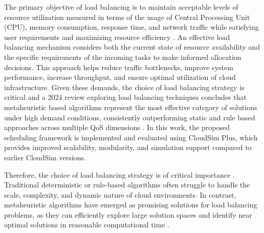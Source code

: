 \documentclass[pdflatex,sn-mathphys-num]{sn-jnl}%
\begin{document}
The primary objective of load balancing is to maintain acceptable levels of resource utilization measured in terms of the usage of Central Processing Unit (CPU), memory consumption, response time, and network traffic while satisfying user requirements and maximizing resource efficiency \cite{loadBalancing2}. An effective load balancing mechanism considers both the current state of resource availability and the specific requirements of the incoming tasks to make informed allocation decisions. This approach helps reduce traffic bottlenecks, improve system performance, increase throughput, and ensure optimal utilization of cloud infrastructure. Given these demands, the choice of load balancing strategy is critical and a 2024 review exploring load balancing techniques concludes that metaheuristic based algorithms represent the most effective category of solutions under high demand conditions, consistently outperforming static and rule based approaches across multiple QoS dimensions \cite{LoadBalancing3_sol, sultan2026improving_lb_csplus}. In this work, the proposed scheduling framework is implemented and evaluated using CloudSim Plus, which provides improved scalability, modularity, and simulation support compared to earlier CloudSim versions.

Therefore, the choice of load balancing strategy is of critical importance \cite{LoadBalancing3_sol}. Traditional deterministic or rule-based algorithms often struggle to handle the scale, complexity, and dynamic nature of cloud environments. In contrast, metaheuristic algorithms have emerged as promising solutions for load balancing problems, as they can efficiently explore large solution spaces and identify near optimal solutions in reasonable computational time \cite{PSO, Adegbite2026_intro_for_meta_as_sol}.
\end{document}
